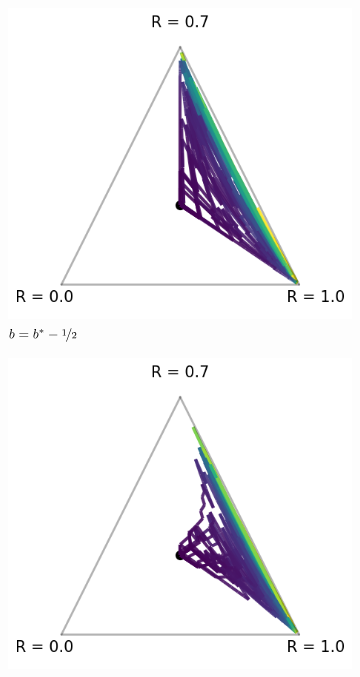 \begin{figure}[!ht]
\centering
  \begin{subfigure}[b]{0.245\linewidth}
    \includegraphics[width=\textwidth]{articles/baselines/figs/appendix_figs_3arm_000/vanilla_minvar_-05.png}
    \caption{$b = b^\ast - \nicefrac{1}{2}$}
  \end{subfigure}
    \begin{subfigure}[b]{0.245\linewidth}
    \includegraphics[width=\textwidth]{articles/baselines/figs/appendix_figs_3arm_000/vanilla_minvar_00.png}

\end{subfigure}
\end{figure}
